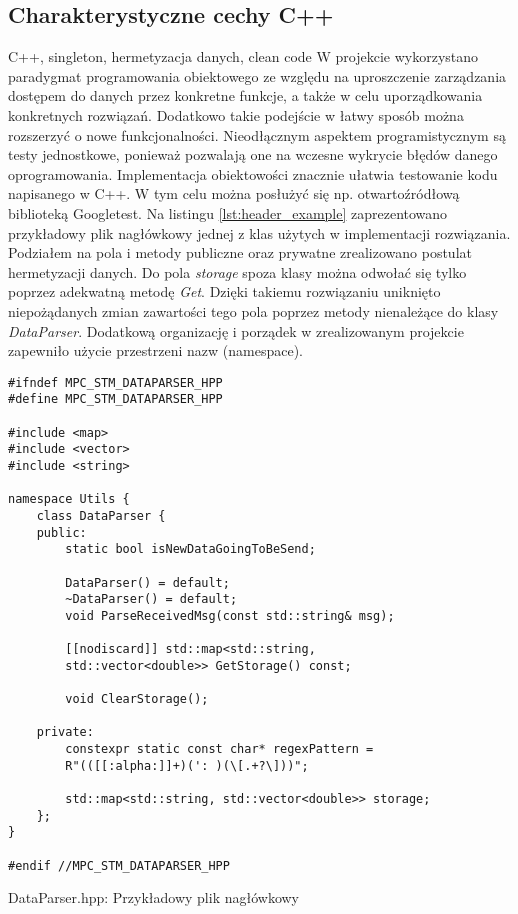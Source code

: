 \subsection{Charakterystyczne cechy C++} \label{sec:cpp_details}
C++, singleton, hermetyzacja danych, clean code
W projekcie wykorzystano paradygmat programowania obiektowego ze względu na uproszczenie zarządzania
dostępem do danych przez konkretne funkcje, a także w celu uporządkowania konkretnych rozwiązań.
Dodatkowo takie podejście w łatwy sposób można rozszerzyć o nowe funkcjonalności. Nieodłącznym 
aspektem programistycznym są testy jednostkowe, ponieważ pozwalają one na wczesne wykrycie błędów
danego oprogramowania. Implementacja obiektowości znacznie ułatwia testowanie kodu napisanego w C++.
W tym celu można posłużyć się np. otwartoźródłową biblioteką Googletest. Na listingu
\ref{lst:header_example} zaprezentowano przykładowy plik nagłówkowy jednej z klas użytych w
implementacji rozwiązania. Podziałem na pola i metody publiczne oraz prywatne zrealizowano
postulat hermetyzacji danych. Do pola \textit{storage} spoza klasy można odwołać się tylko poprzez
adekwatną metodę \textit{Get}. Dzięki takiemu rozwiązaniu uniknięto niepożądanych zmian zawartości
tego pola poprzez metody nienależące do klasy \textit{DataParser}. Dodatkową organizację i porządek
w zrealizowanym projekcie zapewniło użycie przestrzeni nazw (namespace). 
\begin{listing}[htb]
\begin{verbatim}
#ifndef MPC_STM_DATAPARSER_HPP
#define MPC_STM_DATAPARSER_HPP

#include <map>
#include <vector>
#include <string>

namespace Utils {
    class DataParser {
    public:
        static bool isNewDataGoingToBeSend;

        DataParser() = default;
        ~DataParser() = default;
        void ParseReceivedMsg(const std::string& msg);

        [[nodiscard]] std::map<std::string,
        std::vector<double>> GetStorage() const;
        
        void ClearStorage();

    private:
        constexpr static const char* regexPattern = 
        R"(([[:alpha:]]+)(': )(\[.+?\]))";

        std::map<std::string, std::vector<double>> storage;
    };
}

#endif //MPC_STM_DATAPARSER_HPP
\end{verbatim}
\caption{DataParser.hpp: Przykładowy plik nagłówkowy}
\label{lst:header_example}
\end{listing}

